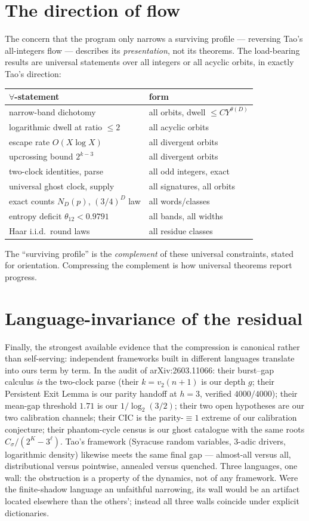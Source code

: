 \documentclass[11pt]{article}
\newcommand{\vt}{v_2}
\begin{document}
\section{The direction of flow}

The concern that the program only narrows a surviving profile ---
reversing Tao's all-integers flow --- describes its
\emph{presentation}, not its theorems. The load-bearing results are
universal statements over all integers or all acyclic orbits, in
exactly Tao's direction:
\begin{center}
\begin{tabular}{ll}
\toprule
$\forall$-statement & form\\
\midrule
narrow-band dichotomy & all orbits, dwell $\le CY^{\theta(D)}$\\
logarithmic dwell at ratio $\le2$ & all acyclic orbits\\
escape rate $O(X\log X)$ & all divergent orbits\\
upcrossing bound $2^{k-3}$ & all divergent orbits\\
two-clock identities, parse & all odd integers, exact\\
universal ghost clock, supply & all signatures, all orbits\\
exact counts $N_D(p)$, $(3/4)^D$ law & all words/classes\\
entropy deficit $\theta_{12}<0.9791$ & all bands, all widths\\
Haar i.i.d.\ round laws & all residue classes\\
\bottomrule
\end{tabular}
\end{center}
The ``surviving profile'' is the \emph{complement} of these universal
constraints, stated for orientation. Compressing the complement is
how universal theorems report progress.

\section{Language-invariance of the residual}

Finally, the strongest available evidence that the compression is
canonical rather than self-serving: independent frameworks built in
different languages translate into ours term by term. In the audit of
arXiv:2603.11066: their burst--gap calculus \emph{is} the two-clock
parse (their $k=\vt(n+1)$ is our depth $g$; their Persistent Exit
Lemma is our parity handoff at $h=3$, verified $4000/4000$); their
mean-gap threshold $1.71$ is our $1/\log_2(3/2)$; their two open
hypotheses are our two calibration channels; their CIC is the
parity-$\equiv1$ extreme of our calibration conjecture; their
phantom-cycle census is our ghost catalogue with the same roots
$C_\sigma/(2^K-3^\ell)$. Tao's framework (Syracuse random variables,
$3$-adic drivers, logarithmic density) likewise meets the same
final gap --- almost-all versus all, distributional versus pointwise,
annealed versus quenched. Three languages, one wall: the obstruction
is a property of the dynamics, not of any framework. Were the
finite-shadow language an unfaithful narrowing, its wall would be an
artifact located elsewhere than the others'; instead all three walls
coincide under explicit dictionaries.
\end{document}
